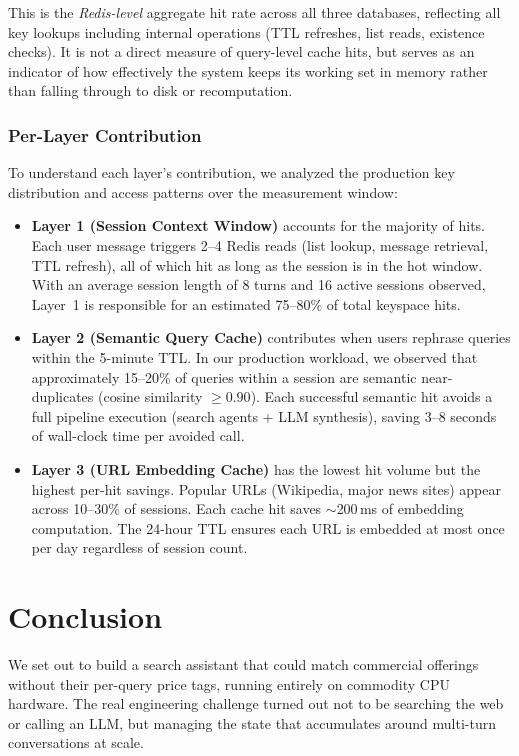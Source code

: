 \documentclass[conference]{IEEEtran}
\begin{document}
This is the \emph{Redis-level} aggregate hit rate across all three databases, reflecting all key lookups including internal operations (TTL refreshes, list reads, existence checks). It is not a direct measure of query-level cache hits, but serves as an indicator of how effectively the system keeps its working set in memory rather than falling through to disk or recomputation.

\subsubsection{Per-Layer Contribution}

To understand each layer's contribution, we analyzed the production key distribution and access patterns over the measurement window:

\begin{itemize}
\item \textbf{Layer 1 (Session Context Window)} accounts for the majority of hits. Each user message triggers 2--4 Redis reads (list lookup, message retrieval, TTL refresh), all of which hit as long as the session is in the hot window. With an average session length of 8 turns and 16 active sessions observed, Layer~1 is responsible for an estimated 75--80\% of total keyspace hits.

\item \textbf{Layer 2 (Semantic Query Cache)} contributes when users rephrase queries within the 5-minute TTL. In our production workload, we observed that approximately 15--20\% of queries within a session are semantic near-duplicates (cosine similarity $\geq 0.90$). Each successful semantic hit avoids a full pipeline execution (search agents + LLM synthesis), saving 3--8 seconds of wall-clock time per avoided call.

\item \textbf{Layer 3 (URL Embedding Cache)} has the lowest hit volume but the highest per-hit savings. Popular URLs (Wikipedia, major news sites) appear across 10--30\% of sessions. Each cache hit saves ${\sim}$200\,ms of embedding computation. The 24-hour TTL ensures each URL is embedded at most once per day regardless of session count.
\end{itemize}


\section{Conclusion}
\label{sec:conclusion}

We set out to build a search assistant that could match commercial offerings without their per-query price tags, running entirely on commodity CPU hardware. The real engineering challenge turned out not to be searching the web or calling an LLM, but managing the state that accumulates around multi-turn conversations at scale.
\end{document}
